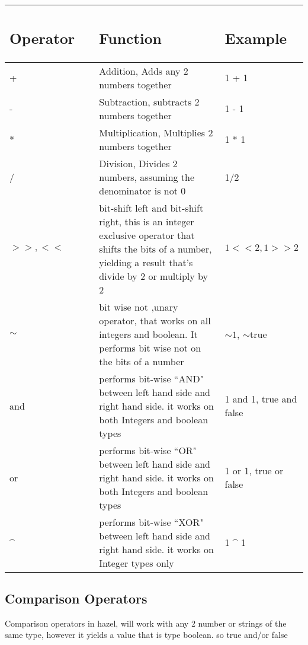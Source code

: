 \documentclass{article}
\begin{document}
\begin{table}[H]
    \centering
    \begin{tabular}{p{0.35\linewidth} | p{0.6\linewidth}| p{0.6\linewidth} }
      
\subsection*{Operator} & \subsection*{Function} & \subsection*{Example}
 \\ \hline
      + & Addition, Adds any 2 numbers together & 1 + 1 \\ \hline
      - & Subtraction, subtracts 2 numbers together  & 1 - 1 \\ \hline
      * & Multiplication, Multiplies 2 numbers together & 1 * 1\\ \hline
      / & Division, Divides 2 numbers, assuming the denominator is not 0 & 1/2 \\ \hline
      $>>,<<$ & bit-shift left and bit-shift right, this is an integer exclusive operator that shifts the bits of a number, yielding a result that's divide by 2 or multiply by 2 & $1 << 2, 1 >> 2$  \\ \hline   
      $\sim$ & bit wise not ,unary operator, that works on all integers and boolean. It performs bit wise not on the bits of a number & $\sim1$, $\sim$true  \\ \hline     
       and & performs bit-wise ``AND" between left hand side and right hand side. it works on both Integers and boolean types & 1 and 1, true and false   \\ \hline   
      or & performs bit-wise ``OR" between left hand side and right hand side. it works on both Integers and boolean types & 1 or 1, true or false   \\ \hline   
      \^{ } & performs bit-wise ``XOR" between left hand side and right hand side. it works on Integer types only & 1 \^{ } 1   \\ \hline   
      
    \end{tabular}
       
\end{table}


\subsection{Comparison Operators}
Comparison operators in hazel, will work with any 2 number or strings of the same type, however it yields
a value that is type boolean. so true and/or false 
\end{document}
